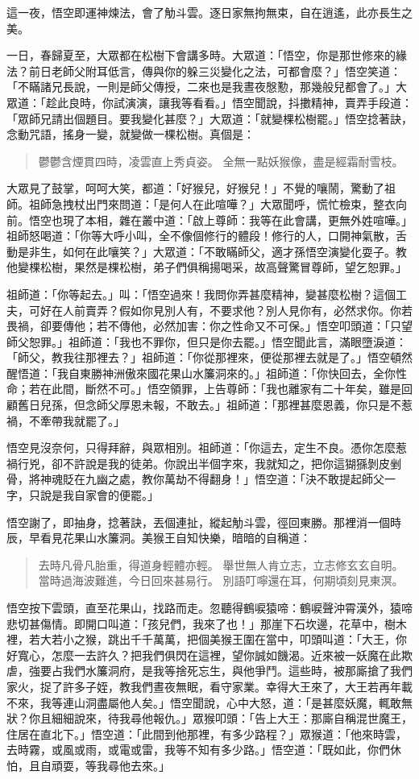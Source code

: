 這一夜，悟空即運神煉法，會了觔斗雲。逐日家無拘無束，自在逍遙，此亦長生之美。

一日，春歸夏至，大眾都在松樹下會講多時。大眾道：「悟空，你是那世修來的緣法？前日老師父附耳低言，傳與你的躲三災變化之法，可都會麼？」悟空笑道：「不瞞諸兄長說，一則是師父傳授，二來也是我晝夜慇懃，那幾般兒都會了。」大眾道：「趁此良時，你試演演，讓我等看看。」悟空聞說，抖擻精神，賣弄手段道：「眾師兄請出個題目。要我變化甚麼？」大眾道：「就變棵松樹罷。」悟空捻著訣，念動咒語，搖身一變，就變做一棵松樹。真個是：
\begin{quote}
鬱鬱含煙貫四時，凌雲直上秀貞姿。
全無一點妖猴像，盡是經霜耐雪枝。
\end{quote}

大眾見了鼓掌，呵呵大笑，都道：「好猴兒，好猴兒！」不覺的嚷鬧，驚動了祖師。祖師急拽杖出門來問道：「是何人在此喧嘩？」大眾聞呼，慌忙檢束，整衣向前。悟空也現了本相，雜在叢中道：「啟上尊師：我等在此會講，更無外姓喧嘩。」祖師怒喝道：「你等大呼小叫，全不像個修行的體段！修行的人，口開神氣散，舌動是非生，如何在此嚷笑？」大眾道：「不敢瞞師父，適才孫悟空演變化耍子。教他變棵松樹，果然是棵松樹，弟子們俱稱揚喝采，故高聲驚冒尊師，望乞恕罪。」

祖師道：「你等起去。」叫：「悟空過來！我問你弄甚麼精神，變甚麼松樹？這個工夫，可好在人前賣弄？假如你見別人有，不要求他？別人見你有，必然求你。你若畏禍，卻要傳他；若不傳他，必然加害：你之性命又不可保。」悟空叩頭道：「只望師父恕罪。」祖師道：「我也不罪你，但只是你去罷。」悟空聞此言，滿眼墮淚道：「師父，教我往那裡去？」祖師道：「你從那裡來，便從那裡去就是了。」悟空頓然醒悟道：「我自東勝神洲傲來國花果山水簾洞來的。」祖師道：「你快回去，全你性命；若在此間，斷然不可。」悟空領罪，上告尊師：「我也離家有二十年矣，雖是回顧舊日兒孫，但念師父厚恩未報，不敢去。」祖師道：「那裡甚麼恩義，你只是不惹禍，不牽帶我就罷了。」

悟空見沒奈何，只得拜辭，與眾相別。祖師道：「你這去，定生不良。憑你怎麼惹禍行兇，卻不許說是我的徒弟。你說出半個字來，我就知之，把你這猢猻剝皮剉骨，將神魂貶在九幽之處，教你萬劫不得翻身！」悟空道：「決不敢提起師父一字，只說是我自家會的便罷。」

悟空謝了，即抽身，捻著訣，丟個連扯，縱起觔斗雲，徑回東勝。那裡消一個時辰，早看見花果山水簾洞。美猴王自知快樂，暗暗的自稱道：
\begin{quote}
去時凡骨凡胎重，得道身輕體亦輕。
舉世無人肯立志，立志修玄玄自明。
當時過海波難進，今日回來甚易行。
別語叮嚀還在耳，何期頃刻見東溟。
\end{quote}

悟空按下雲頭，直至花果山，找路而走。忽聽得鶴唳猿啼：鶴唳聲沖霄漢外，猿啼悲切甚傷情。即開口叫道：「孩兒們，我來了也！」那崖下石坎邊，花草中，樹木裡，若大若小之猴，跳出千千萬萬，把個美猴王圍在當中，叩頭叫道：「大王，你好寬心，怎麼一去許久？把我們俱閃在這裡，望你誠如饑渴。近來被一妖魔在此欺虐，強要占我們水簾洞府，是我等捨死忘生，與他爭鬥。這些時，被那廝搶了我們家火，捉了許多子姪，教我們晝夜無眠，看守家業。幸得大王來了，大王若再年載不來，我等連山洞盡屬他人矣。」悟空聞說，心中大怒，道：「是甚麼妖魔，輒敢無狀？你且細細說來，待我尋他報仇。」眾猴叩頭：「告上大王：那廝自稱混世魔王，住居在直北下。」悟空道：「此間到他那裡，有多少路程？」眾猴道：「他來時雲，去時霧，或風或雨，或電或雷，我等不知有多少路。」悟空道：「既如此，你們休怕，且自頑耍，等我尋他去來。」


